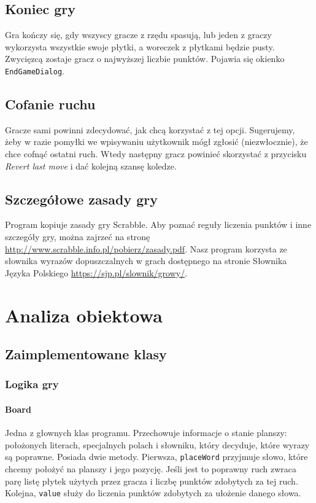 \documentclass[a4paper]{article}
\begin{document}
\subsection{Koniec gry}
Gra kończy się, gdy wszyscy gracze z rzędu spasują, lub jeden z graczy wykorzysta wszystkie swoje płytki, a woreczek z płytkami będzie pusty.
Zwycięzcą zostaje gracz o najwyższej liczbie punktów.
Pojawia się okienko \texttt{EndGameDialog}.
\subsection{Cofanie ruchu}
Gracze sami powinni zdecydować, jak chcą korzystać z tej opcji.
Sugerujemy, żeby w razie pomyłki we wpisywaniu użytkownik mógł zgłosić (niezwłocznie), że chce cofnąć ostatni ruch.
Wtedy następny gracz powinieć skorzystać z przycisku \textit{Revert last move} i dać kolejną szansę koledze.
\subsection{Szczegółowe zasady gry}
Program kopiuje zasady gry Scrabble.
Aby poznać reguły liczenia punktów i inne szczegóły gry, można zajrzeć na stronę \url{http://www.scrabble.info.pl/pobierz/zasady.pdf}.
Nasz program korzysta ze słownika wyrazów dopuszczalnych w grach dostępnego na stronie Słownika Języka Polskiego \url{https://sjp.pl/slownik/growy/}.
\section{Analiza obiektowa}

\subsection{Zaimplementowane klasy}

\subsubsection{Logika gry}

\paragraph{Board} Jedna z głownych klas programu. Przechowuje informacje o stanie planszy: położonych literach, specjalnych polach i słowniku, który decyduje, które wyrazy są poprawne. Posiada dwie metody. Pierwsza, \texttt{placeWord} przyjmuje słowo, które chcemy położyć na planszy i jego pozycję. Jeśli jest to poprawny ruch zwraca parę listę płytek użytych przez gracza i liczbę punktów zdobytych za tej ruch. Kolejna, \texttt{value} służy do liczenia punktów zdobytych za ułożenie danego słowa.
\end{document}
